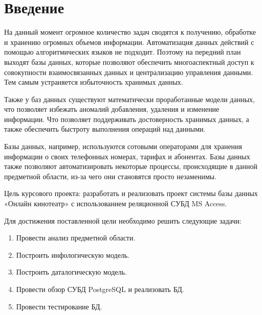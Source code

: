 \section*{Введение}\label{sec:introduction}




На данный момент огромное количество задач сводятся к получению, обработке и хранению огромных объемов информации. Автоматизация данных действий с помощью алгоритмических языков не подходит. Поэтому на передний план выходят базы данных, которые позволяют обеспечить многоаспектный доступ к совокупности взаимосвязанных данных и централизацию управления данными. Тем самым устраняется избыточность хранимых данных.

Также у баз данных существуют математически проработанные модели данных, что позволяет избежать аномалий добавления, удаления и изменение информации. Что позволяет поддерживать достоверность хранимых данных, а также обеспечить быстроту выполнения операций над данными.

Базы данных, например, используются сотовыми операторами для хранения информации о своих телефонных номерах, тарифах и абонентах. Базы данных также позволяют автоматизировать некоторые процессы, происходящие в данной предметной области, из-за чего они становятся просто незаменимы.

Цель курсового проекта: разработать и реализовать проект системы базы данных «Онлайн кинотеатр» с использованием реляционной СУБД MS Access.

Для достижения поставленной цели необходимо решить следующие задачи:
\begin{enumerate}
    \item Провести анализ предметной области.
    \item Построить инфологическую модель.
    \item Построить даталогическую модель.
    \item Провести обзор СУБД PostgreSQL и реализовать БД.
    \item Провести тестирование БД.
\end{enumerate}


\newpage
